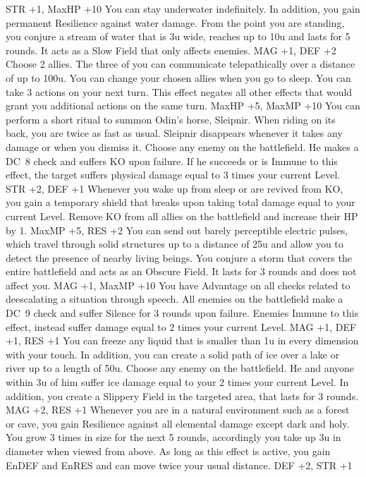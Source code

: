 {STR +1, MaxHP +10}
%
\vfill
%
{You can stay underwater indefinitely. In addition, you gain permanent Resilience against water damage.}
{From the point you are standing, you conjure a stream of water that is 3u wide, reaches up to 10u and lasts for 5 rounds. It acts as a Slow Field that only affects enemies.}
{MAG +1, DEF +2}
%
\vfill
%
{Choose 2 allies. The three of you can communicate telepathically over a distance of up to 100u. You can change your chosen allies when you go to sleep.}
{You can take 3 actions on your next turn. This effect negates all other effects that would grant you additional actions on the same turn.}
{MaxHP +5, MaxMP +10}
%
\clearpage
%
{You can perform a short ritual to summon Odin's horse, Sleipnir. When riding on its back, you are twice as fast as usual. Sleipnir disappears whenever it takes any damage or when you dismiss it.}
{Choose any enemy on the battlefield. He makes a DC~8 check and suffers KO upon failure. If he succeeds or is Immune to this effect, the target suffers physical damage equal to 3 times your current Level.}
{STR +2, DEF +1}
%
\vfill
%
{Whenever you wake up from sleep or are revived from KO, you gain a temporary shield that breaks upon taking total damage equal to your current Level.}
{Remove KO from all allies on the battlefield and increase their HP by 1.}
{MaxMP +5, RES +2}
%
\vfill
%
{You can send out barely perceptible electric pulses, which travel through solid structures up to a distance of 25u and allow you to detect the presence of nearby living beings.}
{You conjure a storm  that covers the entire battlefield and acts as an Obscure Field. It lasts for 3 rounds and does not affect you.}
{MAG +1, MaxMP +10}
%
\vfill
%
{You have Advantage on all checks related to deescalating a situation through speech.}
{All enemies on the battlefield make a DC~9 check and suffer Silence for 3 rounds upon failure. Enemies Immune to this effect, instead suffer damage equal to 2 times your current Level.}
{MAG +1, DEF +1, RES +1}
%
\vfill
%
{You can freeze any liquid that is smaller than 1u in every dimension with your touch. In addition, you can create a solid path of ice over a lake or river up to a length of 50u.}
{Choose any enemy on the battlefield. He and anyone within 3u of him suffer ice damage equal to your 2 times your current Level. In addition, you create a Slippery Field in the targeted area, that lasts for 3 rounds.}
{MAG +2, RES +1}
%
\vfill
%
{Whenever you are in a natural environment such as a forest or cave, you gain Resilience against all elemental damage except dark and holy.}
{You grow 3 times in size for the next 5 rounds, accordingly you take up 3u in diameter when viewed from above. As long as this effect is active, you gain EnDEF and EnRES and can move twice your usual distance.}
{DEF +2, STR +1}
%
\clearpage